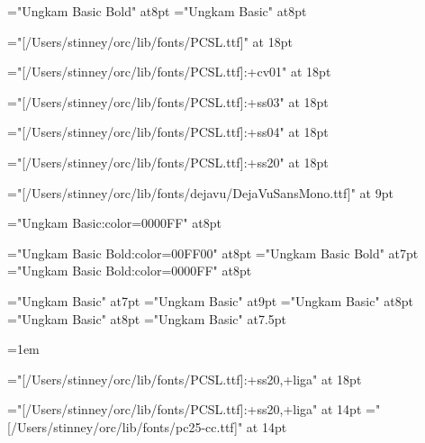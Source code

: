 \let\seq\relax
\let\lname\relax
\let\sname\relax
\let\uname\relax
\let\chars\relax
\let\names\relax
\let\glyph\relax
\let\rglyf\relax
\let\image\relax
\let\notes\relax
\let\stags\relax

\let\sqdbcun\relax
\let\sqdbpua\relax
\let\sqseq\relax
\let\sqinv\relax
\let\sqchr\relax

\let\imagefloat\relax
\let\imagecaption\relax

\let\remfor\relax
\let\Hhhhh\relax

\let\glyf\relax
\let\fchr\relax
\let\fhex\relax
\let\dist\relax
\let\rhex\relax

\let\sl\relax
\let\slc\relax
\let\slcc\relax
\let\cdligh\relax
\let\zatu\relax
\def\diffc{\let\ofspc\relax\pcfee}
\def\diffd{\message{hvfee}\hvfee}

\font\slnmfont="Ungkam Basic Bold" at8pt
\font\sltgfont="Ungkam Basic" at8pt


\font\pcxxv="[/Users/stinney/orc/lib/fonts/PCSL.ttf]" at 18pt

\font\pccvi="[/Users/stinney/orc/lib/fonts/PCSL.ttf]:+cv01" at 18pt

\font\pcssiii="[/Users/stinney/orc/lib/fonts/PCSL.ttf]:+ss03" at 18pt

\font\pcssiv="[/Users/stinney/orc/lib/fonts/PCSL.ttf]:+ss04" at 18pt

\font\pcssxx="[/Users/stinney/orc/lib/fonts/PCSL.ttf]:+ss20" at 18pt

\font\mono="[/Users/stinney/orc/lib/fonts/dejavu/DejaVuSansMono.ttf]" at 9pt

\font\blungkam="Ungkam Basic:color=0000FF" at8pt

\font\slnmfontw="Ungkam Basic Bold:color=00FF00" at8pt
\font\slnmfontx="Ungkam Basic Bold" at7pt
\font\slnmfonty="Ungkam Basic Bold:color=0000FF" at8pt

\font\akafont="Ungkam Basic" at7pt
\font\sldistfont="Ungkam Basic" at9pt
\font\oidfont="Ungkam Basic" at8pt
\font\oidfontx="Ungkam Basic" at8pt
\font\zatufont="Ungkam Basic" at7.5pt

\oidfont{}=1em %

\font\pcssXX="[/Users/stinney/orc/lib/fonts/PCSL.ttf]:+ss20,+liga" at 18pt

\font\pcssxx="[/Users/stinney/orc/lib/fonts/PCSL.ttf]:+ss20,+liga" at 14pt
\font\pccc="[/Users/stinney/orc/lib/fonts/pc25-cc.ttf]" at 14pt


